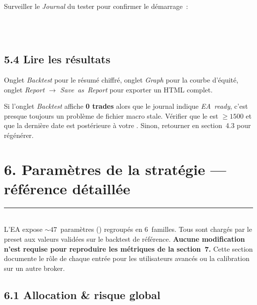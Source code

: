 \documentclass[11pt, a4paper]{scrartcl}
\begin{document}
Surveiller le \emph{Journal} du tester pour confirmer le démarrage~:

\begin{center}
\small{}\\
\\
\code{[2020.11.23 ... 2026.05.01]}
\end{center}

\subsection*{5.4 Lire les résultats}

Onglet \emph{Backtest} pour le résumé chiffré, onglet \emph{Graph} pour
la courbe d'équité, onglet \emph{Report $\rightarrow$ Save~as~Report}
pour exporter un HTML complet.

\begin{warningbox}
Si l'onglet \emph{Backtest} affiche \textbf{0 trades} alors que le journal
indique \emph{EA~ready}, c'est presque toujours un problème de fichier
macro stale. Vérifier que le  est $\geq 1500$ et que
la dernière date est postérieure à votre . Sinon, retourner
en section~4.3 pour régénérer.
\end{warningbox}


\section*{6. Paramètres de la stratégie --- référence détaillée}
\vspace{-0.4em}
{\color{accent}\rule{\linewidth}{1.0pt}}\\[0.4em]

L'EA expose $\sim 47$~paramètres () regroupés en 6~familles. Tous sont
chargés par le preset  aux valeurs validées sur
le backtest de référence. \textbf{Aucune modification n'est requise pour
reproduire les métriques de la section~7.} Cette section documente le rôle de
chaque entrée pour les utilisateurs avancés ou la calibration sur un autre
broker.

\subsection*{6.1 Allocation \& risque global}
\end{document}
